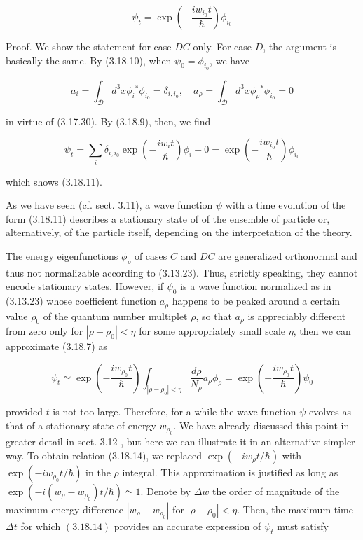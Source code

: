 \documentclass{article}
\begin{document}
\begin{equation*}
\psi_{t}=\exp \left(-\frac{i w_{i_{0}} t}{\hbar}\right) \phi_{i_{0}} \tag{3.18.11}
\end{equation*}
 

Proof. We show the statement for case $D C$ only. For case $D$, the argument is basically the same. By (3.18.10), when $\psi_{0}=\phi_{i_{0}}$, we have
 
\begin{equation*}
a_{i}=\int_{\mathcal{D}} d^{3} x \phi_{i}{ }^{*} \phi_{i_{0}}=\delta_{i, i_{0}}, \quad a_{\rho}=\int_{\mathcal{D}} d^{3} x \phi_{\rho}{ }^{*} \phi_{i_{0}}=0 \tag{3.18.12}
\end{equation*}
 
in virtue of (3.17.30). By (3.18.9), then, we find
 
\begin{equation*}
\psi_{t}=\sum_{i} \delta_{i, i_{0}} \exp \left(-\frac{i w_{i} t}{\hbar}\right) \phi_{i}+0=\exp \left(-\frac{i w_{i_{0}} t}{\hbar}\right) \phi_{i_{0}} \tag{3.18.13}
\end{equation*}
 
which shows (3.18.11).

As we have seen (cf. sect. 3.11), a wave function $\psi$ with a time evolution of the form (3.18.11) describes a stationary state of of the ensemble of particle or, alternatively, of the particle itself, depending on the interpretation of the theory.

The energy eigenfunctions $\phi_{\rho}$ of cases $C$ and $D C$ are generalized orthonormal and thus not normalizable according to (3.13.23). Thus, strictly speaking, they cannot encode stationary states. However, if $\psi_{0}$ is a wave function normalized as in (3.13.23) whose coefficient function $a_{\rho}$ happens to be peaked around a certain value $\rho_{0}$ of the quantum number multiplet $\rho$, so that $a_{\rho}$ is appreciably different from zero only for $\left|\rho-\rho_{0}\right|<\eta$ for some appropriately small scale $\eta$, then we can approximate (3.18.7) as
 
\begin{equation*}
\psi_{t} \simeq \exp \left(-\frac{i w_{\rho_{0}} t}{\hbar}\right) \int_{\left|\rho-\rho_{0}\right|<\eta} \frac{d \rho}{N_{\rho}} a_{\rho} \phi_{\rho}=\exp \left(-\frac{i w_{\rho_{0}} t}{\hbar}\right) \psi_{0} \tag{3.18.14}
\end{equation*}
 
provided $t$ is not too large. Therefore, for a while the wave function $\psi$ evolves as that of a stationary state of energy $w_{\rho_{0}}$. We have already discussed this point in greater detail in sect. 3.12 , but here we can illustrate it in an alternative simpler way. To obtain relation (3.18.14), we replaced $\exp \left(-i w_{\rho} t / \hbar\right)$ with $\exp \left(-i w_{\rho_{0}} t / \hbar\right)$ in the $\rho$ integral. This approximation is justified as long as $\exp \left(-i\left(w_{\rho}-w_{\rho_{0}}\right) t / \hbar\right) \simeq 1$. Denote by $\Delta w$ the order of magnitude of the maximum energy difference $\left|w_{\rho}-w_{\rho_{0}}\right|$ for $\left|\rho-\rho_{0}\right|<\eta$. Then, the maximum time $\Delta t$ for which $(3.18 .14)$ provides an accurate expression of $\psi_{t}$ must satisfy
 
\end{document}
